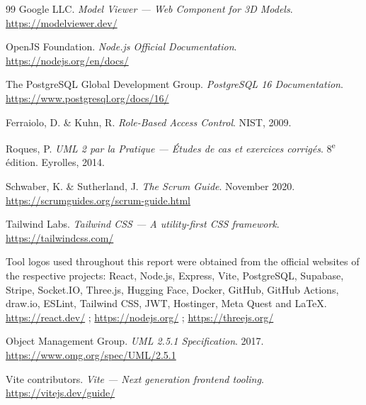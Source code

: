 \documentclass[12pt, a4paper, oneside]{report}
\begin{document}
\begin{thebibliography}{99}
Google LLC. \textit{Model Viewer --- Web Component for 3D Models}.\\
\url{https://modelviewer.dev/} 

OpenJS Foundation. \textit{Node.js Official Documentation}.\\
\url{https://nodejs.org/en/docs/} 

The PostgreSQL Global Development Group. \textit{PostgreSQL 16 Documentation}.\\
\url{https://www.postgresql.org/docs/16/} 

Ferraiolo, D. \& Kuhn, R. \textit{Role-Based Access Control}. NIST, 2009.

Roques, P. \textit{UML 2 par la Pratique --- Études de cas et exercices corrigés}.
8\textsuperscript{e} édition. Eyrolles, 2014.

Schwaber, K. \& Sutherland, J. \textit{The Scrum Guide}. November 2020.\\
\url{https://scrumguides.org/scrum-guide.html} 

Tailwind Labs. \textit{Tailwind CSS --- A utility-first CSS framework}.\\
\url{https://tailwindcss.com/} 

Tool logos used throughout this report were obtained from the official websites
of the respective projects: React, Node.js, Express, Vite, PostgreSQL, Supabase,
Stripe, Socket.IO, Three.js, Hugging Face, Docker, GitHub, GitHub Actions,
draw.io, ESLint, Tailwind CSS, JWT, Hostinger, Meta Quest and \LaTeX.\\
\url{https://react.dev/} ; \url{https://nodejs.org/} ; \url{https://threejs.org/}

Object Management Group. \textit{UML 2.5.1 Specification}. 2017.\\
\url{https://www.omg.org/spec/UML/2.5.1} 

Vite contributors. \textit{Vite --- Next generation frontend tooling}.\\
\url{https://vitejs.dev/guide/} 

\end{thebibliography}

\clearpage

\end{document}

